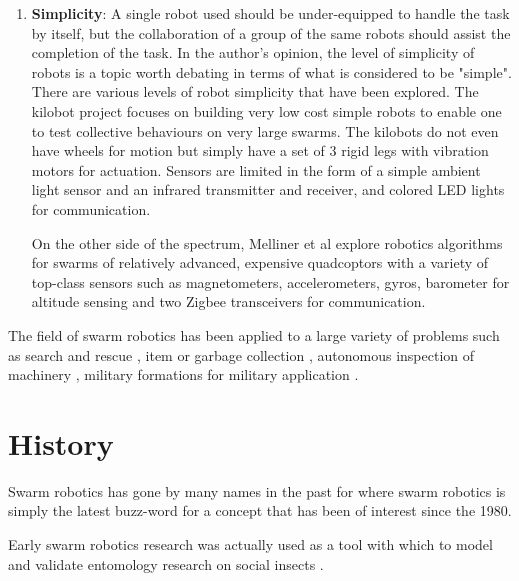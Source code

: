 \begin{enumerate}
\item \textbf{Simplicity}: A single robot used should be under-equipped to handle the task by itself, but the collaboration of a group of the same robots should assist the completion of the task. In the author's opinion, the level of simplicity of robots is a topic worth debating in terms of what is considered to be "simple". There are various levels of robot simplicity that have been explored. The kilobot project \cite{rubenstein2012kilobot} focuses on building very low cost simple robots to enable one to test collective behaviours on very large swarms. The kilobots do not even have wheels for motion but simply have a set of 3 rigid legs with vibration motors for actuation. Sensors are limited in the form of a simple ambient light sensor and an infrared transmitter and receiver, and colored LED lights for communication. 

On the other side of the spectrum, Melliner et al \cite{mellinger2013cooperative,kushleyev2013towards} explore robotics algorithms for swarms of relatively advanced, expensive quadcoptors with a variety of top-class sensors such as magnetometers, accelerometers, gyros, barometer for altitude sensing and two Zigbee transceivers for communication.
\end{enumerate}

 The field of swarm robotics has been applied to a large variety of problems such as search and rescue \cite{mondada2002search}, item or garbage collection \cite{balch1995io}, autonomous inspection of machinery \cite{correll2007challenging}, military formations for military application \cite{balch1998behavior}.



\section{History}
\label{history}


Swarm robotics has gone by many names in the past for where swarm robotics is simply the latest buzz-word for a concept that has been of interest since the 1980.

Early swarm robotics research was actually used as a tool with which to model and validate  entomology research on social insects \cite{dorigo2014swarm, beni1993swarm, seeley2009wisdom}.


